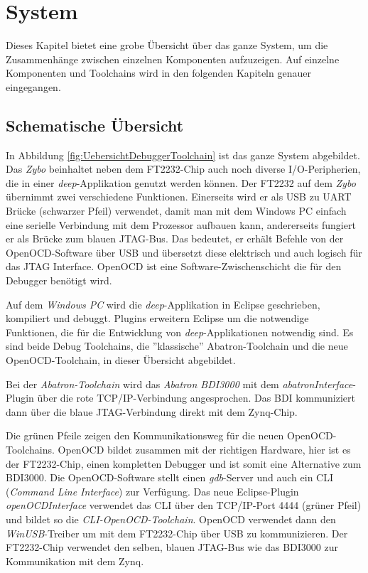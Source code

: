 \chapter{System}
Dieses Kapitel bietet eine grobe Übersicht über das ganze System, um die Zusammenhänge zwischen einzelnen Komponenten aufzuzeigen.
Auf einzelne Komponenten und Toolchains wird in den folgenden Kapiteln genauer eingegangen.


\section{Schematische Übersicht}
In Abbildung \ref{fig:UebersichtDebuggerToolchain} ist das ganze System abgebildet.
Das \textit{Zybo} beinhaltet neben dem FT2232-Chip auch noch diverse I/O-Peripherien, die in einer \textit{deep}-Applikation genutzt werden können.
Der FT2232 auf dem \textit{Zybo} übernimmt zwei verschiedene Funktionen.
Einerseits wird er als USB zu UART Brücke (schwarzer Pfeil) verwendet, damit man mit dem Windows PC einfach eine serielle Verbindung mit dem Prozessor aufbauen kann, andererseits fungiert er als Brücke zum blauen JTAG-Bus.
Das bedeutet, er erhält Befehle von der OpenOCD-Software über USB und übersetzt diese elektrisch und auch logisch für das JTAG Interface.
OpenOCD ist eine Software-Zwischenschicht die für den Debugger benötigt wird.

Auf dem \textit{Windows PC} wird die \textit{deep}-Applikation in Eclipse geschrieben, kompiliert und debuggt.
Plugins erweitern Eclipse um die notwendige Funktionen, die für die Entwicklung von \textit{deep}-Applikationen notwendig sind.
Es sind beide Debug Toolchains, die ''klassische'' Abatron-Toolchain und die neue OpenOCD-Toolchain, in dieser Übersicht abgebildet.

Bei der \textit{Abatron-Toolchain} wird das \textit{Abatron BDI3000} mit dem \textit{abatronInterface}-Plugin über die rote TCP/IP-Verbindung angesprochen.
Das BDI kommuniziert dann über die blaue JTAG-Verbindung direkt mit dem Zynq-Chip.

Die grünen Pfeile zeigen den Kommunikationsweg für die neuen OpenOCD-Toolchains.
OpenOCD bildet zusammen mit der richtigen Hardware, hier ist es der FT2232-Chip, einen kompletten Debugger und ist somit eine Alternative zum BDI3000.
Die OpenOCD-Software stellt einen \textit{gdb}-Server und auch ein CLI (\textit{Command Line Interface}) zur Verfügung.
Das neue Eclipse-Plugin \textit{openOCDInterface} verwendet das CLI über den TCP/IP-Port 4444 (grüner Pfeil) und bildet so die \textit{CLI-OpenOCD-Toolchain}.
OpenOCD verwendet dann den \textit{WinUSB}-Treiber um mit dem FT2232-Chip über USB zu kommunizieren.
Der FT2232-Chip verwendet den selben, blauen JTAG-Bus wie das BDI3000 zur Kommunikation mit dem Zynq.

